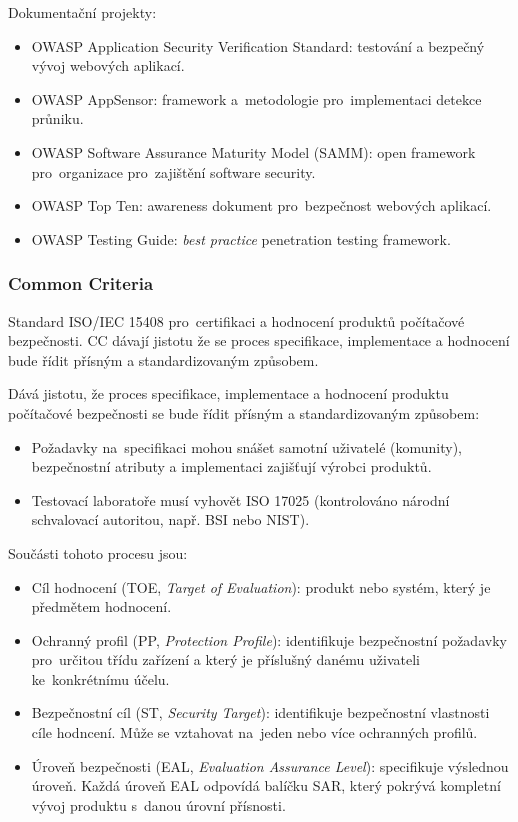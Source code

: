 Dokumentační projekty:
\vspace*{-0.5em}\begin{itemize}
    \item OWASP Application Security Verification Standard: testování a bezpečný vývoj webových aplikací.
    \item OWASP AppSensor: framework a~metodologie pro~implementaci detekce průniku.
    \item OWASP Software Assurance Maturity Model (SAMM): open framework pro~organizace pro~zajištění software security.
    \item OWASP Top Ten: awareness dokument pro~bezpečnost webových aplikací.
    \item OWASP Testing Guide: \emph{best practice} penetration testing framework.
\end{itemize}


\subsubsection{Common Criteria}

Standard ISO/IEC 15408 pro~certifikaci a hodnocení produktů počítačové bezpečnosti.
CC dávají jistotu že se proces specifikace, implementace a hodnocení bude řídit přísným a standardizovaným způsobem.

Dává jistotu, že proces specifikace, implementace a hodnocení produktu počítačové bezpečnosti se bude řídit přísným a standardizovaným způsobem:
\vspace*{-0.5em}\begin{itemize}
    \item Požadavky na~specifikaci mohou snášet samotní uživatelé (komunity), bezpečnostní atributy a implementaci zajišťují výrobci produktů.
    \item Testovací laboratoře musí vyhovět ISO 17025 (kontrolováno národní schvalovací autoritou, např. BSI nebo NIST).
\end{itemize}

Součásti tohoto procesu jsou:
\vspace*{-0.5em}\begin{itemize}
\item
	Cíl hodnocení (TOE, \emph{Target of Evaluation}):
	produkt nebo systém, který je předmětem hodnocení.
\item
	Ochranný profil (PP, \emph{Protection Profile}):
	identifikuje bezpečnostní požadavky pro~určitou třídu zařízení a který je příslušný danému uživateli ke~konkrétnímu účelu.
\item
	Bezpečnostní cíl (ST, \emph{Security Target}):
	identifikuje bezpečnostní vlastnosti cíle hodncení.
	Může se vztahovat na~jeden nebo více ochranných profilů.
\item
	Úroveň bezpečnosti (EAL, \emph{Evaluation Assurance Level}):
	specifikuje výslednou úroveň.
	Každá úroveň EAL odpovídá balíčku SAR, který pokrývá kompletní vývoj produktu s~danou úrovní přísnosti.
\end{itemize}


